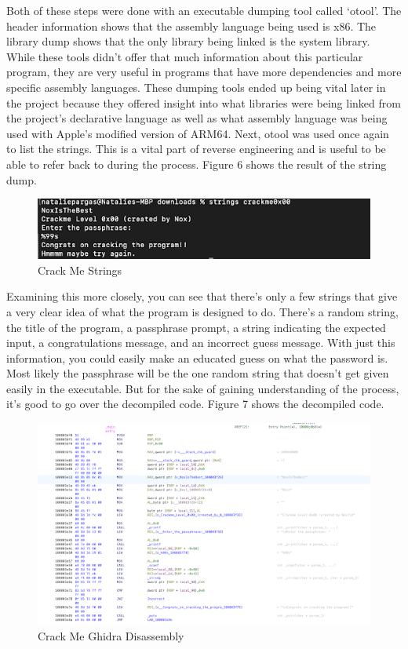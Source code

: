 Both of these steps were done with an executable dumping tool called ‘otool’. 
The header information shows that the assembly language being used is x86. 
The library dump shows that the only library being linked is the system library. 
While these tools didn’t offer that much information about this particular program, they are very useful in programs that have more dependencies and more specific assembly languages. 
These dumping tools ended up being vital later in the project because they offered insight into what libraries were being linked from the project's declarative language as well as what assembly language was being used with Apple’s modified version of ARM64. 
Next, otool was used once again to list the strings. 
This is a vital part of reverse engineering and is useful to be able to refer back to during the process. 
Figure 6 shows the result of the string dump.

\begin{figure}[h]
	\caption{Crack Me Strings}
	\includegraphics{crackmestrings.png}
\end{figure}

Examining this more closely, you can see that there’s only a few strings that give a very clear idea of what the program is designed to do. 
There’s a random string, the title of the program, a passphrase prompt, a string indicating the expected input, a congratulations message, and an incorrect guess message. 
With just this information, you could easily make an educated guess on what the password is. 
Most likely the passphrase will be the one random string that doesn’t get given easily in the executable. 
But for the sake of gaining understanding of the process, it’s good to go over the decompiled code. 
Figure 7 shows the decompiled code.

\begin{figure}[h]
	\caption{Crack Me Ghidra Disassembly}
	\includegraphics{crackmeghidra.png}
\end{figure}

